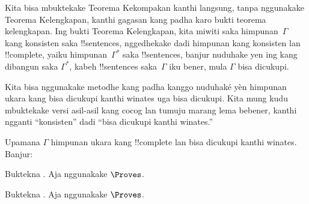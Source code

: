 \documentclass[../../../include/open-logic-section]{subfiles}
\begin{document}
      {}
      {}


Kita bisa mbuktekake Teorema Kekompakan kanthi langsung, tanpa
nggunakake Teorema Kelengkapan, kanthi gagasan kang padha karo bukti
teorema kelengkapan. Ing bukti Teorema Kelengkapan, kita miwiti saka
himpunan~$\Gamma$ kang konsisten saka !!{sentence}s, nggedhekake dadi
himpunan kang konsisten lan !!{complete}, yaiku
himpunan~$\Gamma^*$ saka !!{sentence}s, banjur nuduhake yen ing
kang dibangun saka $\Gamma^*$, kabeh !!{sentence}s saka~$\Gamma$ iku
bener, mula $\Gamma$ bisa dicukupi.

Kita bisa nggunakake metodhe kang padha kanggo nuduhaké yèn himpunan
ukara kang bisa dicukupi kanthi winates uga bisa dicukupi. Kita mung
kudu mbuktekake versi asil-asil kang cocog lan tumuju marang lema
bebener, kanthi ngganti “konsisten” dadi “bisa dicukupi kanthi
winates.”

\begin{prop}
Upamana $\Gamma$ himpunan ukara kang !!{complete} lan bisa dicukupi kanthi winates.
Banjur:
\begin{enumerate}


\end{enumerate}
\end{prop}

\begin{prob}
Buktekna . Aja nggunakake $\Proves$.
\end{prob}
\tagendprob

\begin{prob}
Buktekna . Aja nggunakake $\Proves$.
\end{prob}
\tagendprob

\end{document}
